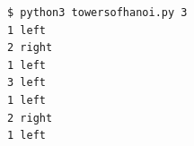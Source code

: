 \documentclass[8pt,a4paper,compress]{beamer}
\begin{document}
\begin{frame}[fragile]
\begin{minipage}{200pt}
\begin{lstlisting}[language={}]
$ python3 towersofhanoi.py 3
1 left
2 right
1 left
3 left
1 left
2 right
1 left
\end{lstlisting}
\end{minipage}
\begin{minipage}{100pt}
\end{minipage}
\end{frame}
\end{document}
